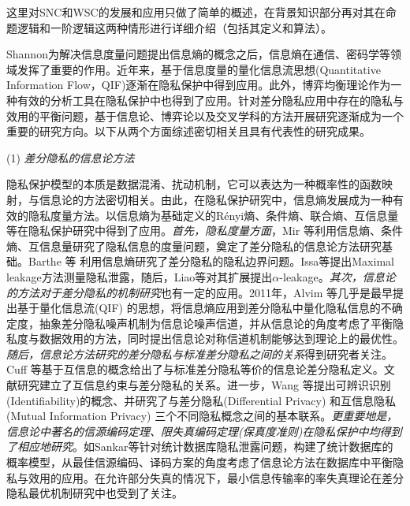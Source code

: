 这里对SNC和WSC的发展和应用只做了简单的概述，在背景知识部分再对其在命题逻辑和一阶逻辑这两种情形进行详细介绍（包括其定义和算法）。




Shannon\cite{shannon1948a}为解决信息度量问题提出信息熵的概念之后，信息熵在通信、密码学等领域发挥了重要的作用。近年来，基于信息度量的量化信息流思想(Quantitative Information Flow，QIF)\cite{smith2009on}逐渐在隐私保护中得到应用。此外，博弈均衡理论作为一种有效的分析工具在隐私保护中也得到了应用。针对差分隐私应用中存在的隐私与效用的平衡问题，基于信息论、博弈论以及交叉学科的方法开展研究逐渐成为一个重要的研究方向。以下从两个方面综述密切相关且具有代表性的研究成果。

(1) {\em 差分隐私的信息论方法}\label{subsec:information_dp}

隐私保护模型的本质是数据混淆、扰动机制，它可以表达为一种概率性的函数映射，与信息论的方法密切相关\cite{Duchi2019information}。由此，在隐私保护研究中，信息熵发展成为一种有效的隐私度量方法\cite{issa2016an,Chatzikokolakis2008Anonymity}。以信息熵为基础定义的R\'{e}nyi熵\cite{renyi1961on,erven2014renyi,mironov2017renyi}、条件熵、联合熵、互信息量等在隐私保护研究中得到了应用\cite{wang2019consistent,mcgregor2010the,du2015Fundamental,lopuhaa-zwakenberg2019information}。{\em 首先，隐私度量方面}，Mir 等\cite{mir2012information}利用信息熵、条件熵、互信息量研究了隐私信息的度量问题，奠定了差分隐私的信息论方法研究基础。Barthe 等\cite{barthe2011information} 利用信息熵研究了差分隐私的隐私边界问题。Issa等\cite{issa2016an,2016Maximal}提出Maximal leakage方法测量隐私泄露，随后，Liao等\cite{liao2019tunable}对其扩展提出$\alpha$-leakage。{\em 其次，信息论的方法对于差分隐私的机制研究}也有一定的应用\cite{diaz2020on,kairouz2016extremal,wang2016on}。2011年，Alvim 等\cite{alvim2011differential,alvim2011on,alvim2015on}几乎是最早提出基于量化信息流(QIF) 的思想，将信息熵应用到差分隐私中量化隐私信息的不确定度，抽象差分隐私噪声机制为信息论噪声信道，并从信息论的角度考虑了平衡隐私度与数据效用的方法，同时提出信息论对称信道机制能够达到理论上的最优性。{\em 随后，信息论方法研究的差分隐私与标准差分隐私之间的关系}得到研究者关注\cite{mcgregor2010the}。Cuff 等\cite{cuff2016differential}基于互信息的概念给出了与标准差分隐私等价的信息论差分隐私定义。文献研究建立了互信息约束与差分隐私的关系。进一步，Wang 等\cite{wang2016on}提出可辨识识别(Identifiability)的概念、并研究了与差分隐私(Differential Privacy) 和互信息隐私(Mutual Information Privacy) 三个不同隐私概念之间的基本联系。{\em 更重要地是，信息论中著名的信源编码定理、限失真编码定理(保真度准则)}\cite{cover2006elements}{\em 在隐私保护中均得到了相应地研究}\cite{rebollo-monedero2010from,du2015Fundamental}。如Sankar等\cite{sankar2013utility}针对统计数据库隐私泄露问题，构建了统计数据库的概率模型，从最佳信源编码、译码方案的角度考虑了信息论方法在数据库中平衡隐私与效用的应用。在允许部分失真的情况下，最小信息传输率的率失真理论在差分隐私\cite{mir2012information,wang2016on}最优机制研究中也受到了关注。

